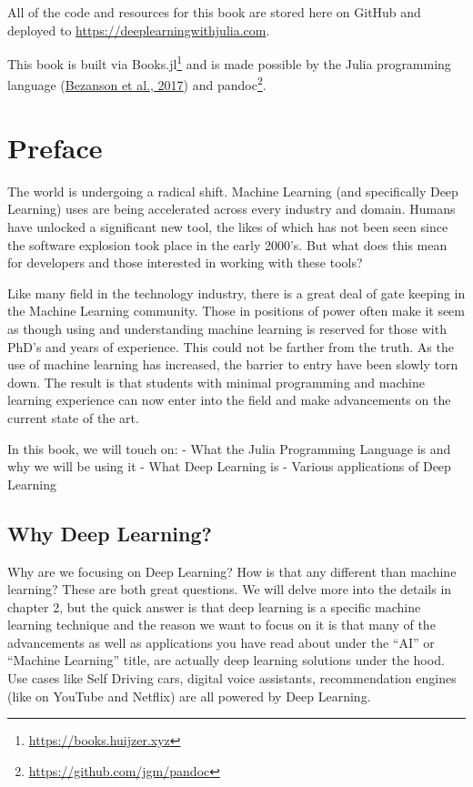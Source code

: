 \documentclass[
  notoc %
]{tufte-book}
\DeclareRobustCommand{\href}[2]{#2\footnote{\url{#1}}}
\begin{document}
All of the code and resources for this book are stored here on GitHub
and deployed to \url{https://deeplearningwithjulia.com}.

This book is built via \href{https://books.huijzer.xyz}{Books.jl} and is
made possible by the Julia programming language
(\protect\hyperlink{ref-bezanson2017julia}{Bezanson et al., 2017}) and
\href{https://github.com/jgm/pandoc}{pandoc}.

\hypertarget{sec:preface}{%
\chapter{Preface}\label{sec:preface}}

The world is undergoing a radical shift. Machine Learning (and
specifically Deep Learning) uses are being accelerated across every
industry and domain. Humans have unlocked a significant new tool, the
likes of which has not been seen since the software explosion took place
in the early 2000's. But what does this mean for developers and those
interested in working with these tools?

Like many field in the technology industry, there is a great deal of
gate keeping in the Machine Learning community. Those in positions of
power often make it seem as though using and understanding machine
learning is reserved for those with PhD's and years of experience. This
could not be farther from the truth. As the use of machine learning has
increased, the barrier to entry have been slowly torn down. The result
is that students with minimal programming and machine learning
experience can now enter into the field and make advancements on the
current state of the art.

In this book, we will touch on: - What the Julia Programming Language is
and why we will be using it - What Deep Learning is - Various
applications of Deep Learning

\hypertarget{sec:why_deep_learning}{%
\section{Why Deep Learning?}\label{sec:why_deep_learning}}

Why are we focusing on Deep Learning? How is that any different than
machine learning? These are both great questions. We will delve more
into the details in chapter 2, but the quick answer is that deep
learning is a specific machine learning technique and the reason we want
to focus on it is that many of the advancements as well as applications
you have read about under the ``AI'' or ``Machine Learning'' title, are
actually deep learning solutions under the hood. Use cases like Self
Driving cars, digital voice assistants, recommendation engines (like on
YouTube and Netflix) are all powered by Deep Learning.
\end{document}
